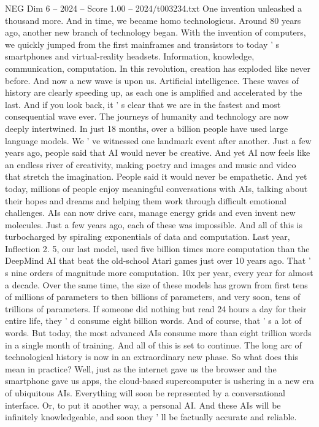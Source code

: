 \begin{textsample}{NEG Dim 6 – 2024 – Score 1.00 – 2024/t003234.txt}
One invention unleashed a thousand more.
And in time, we became homo technologicus.
Around 80 years ago, another new branch of technology began.
With the invention of computers, we quickly jumped from the first mainframes and transistors to today ' s smartphones and virtual-reality headsets.
Information, knowledge, communication, computation.
In this revolution, creation has exploded like never before.
And now a new wave is upon us.
Artificial intelligence.
These waves of history are clearly speeding up, as each one is amplified and accelerated by the last.
And if you look back, it ' s clear that we are in the fastest and most consequential wave ever.
The journeys of humanity and technology are now deeply intertwined.
In just 18 months, over a billion people have used large language models.
We ' ve witnessed one landmark event after another.
Just a few years ago, people said that AI would never be creative.
And yet AI now feels like an endless river of creativity, making poetry and images and music and video that stretch the imagination.
People said it would never be empathetic.
And yet today, millions of people enjoy meaningful conversations with AIs, talking about their hopes and dreams and helping them work through difficult emotional challenges.
AIs can now drive cars, manage energy grids and even invent new molecules.
Just a few years ago, each of these was impossible.
And all of this is turbocharged by spiraling exponentials of data and computation.
Last year, Inflection 2. 5, our last model, used five billion times more computation than the DeepMind AI that beat the old-school Atari games just over 10 years ago.
That ' s nine orders of magnitude more computation. 10x per year, every year for almost a decade.
Over the same time, the size of these models has grown from first tens of millions of parameters to then billions of parameters, and very soon, tens of trillions of parameters.
If someone did nothing but read 24 hours a day for their entire life, they ' d consume eight billion words.
And of course, that ' s a lot of words.
But today, the most advanced AIs consume more than eight trillion words in a single month of training.
And all of this is set to continue.
The long arc of technological history is now in an extraordinary new phase.
So what does this mean in practice?
Well, just as the internet gave us the browser and the smartphone gave us apps, the cloud-based supercomputer is ushering in a new era of ubiquitous AIs.
Everything will soon be represented by a conversational interface.
Or, to put it another way, a personal AI.
And these AIs will be infinitely knowledgeable, and soon they ' ll be factually accurate and reliable.

\end{textsample}
